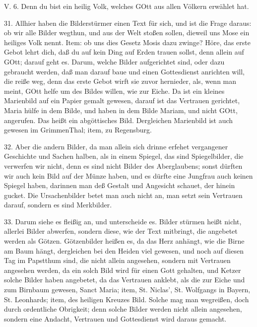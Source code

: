 \begin{schriftzitat}
V. 6. Denn du bist ein heilig Volk, welches GOtt aus allen Völkern erwählet hat.
\end{schriftzitat}

31. Allhier haben die Bilderstürmer einen Text für sich, und ist die Frage daraus: ob wir alle Bilder wegthun, und aus der Welt stoßen sollen, dieweil uns Mose ein heiliges Volk nennt. Item: ob uns dies Gesetz Mosis dazu zwinge? Höre, das erste Gebot lehrt dich, daß du auf kein Ding auf Erden trauen sollst, denn allein auf GOtt; darauf geht es. Darum, welche Bilder aufgerichtet sind, oder dazu gebraucht werden, daß man darauf baue und einen Gottesdienst anrichten will, die reiße weg, denn das erste Gebot wirft sie zuvor hernieder, als, wenn man meint, GOtt helfe um des Bildes willen, wie zur Eiche. Da ist ein kleines Marienbild auf ein Papier gemalt gewesen, darauf ist das Vertrauen gerichtet, Maria hülfe in dem Bilde, und haben in dem Bilde Mariam, und nicht GOtt, angerufen. Das heißt ein abgöttisches Bild. Dergleichen Marienbild ist auch gewesen im GrimmenThal; item, zu Regensburg.

32. Aber die andern Bilder, da man allein sich drinne erfehet vergangener Geschichte und Sachen halben, als in einem Spiegel, das sind Spiegelbilder, die verwerfen wir nicht, denn es sind nicht Bilder des Aberglaubens; sonst dürften wir auch kein Bild auf der Münze haben, und es dürfte eine Jungfrau auch keinen Spiegel haben, darinnen man deß Gestalt und Angesicht schauet, der hinein gucket. Die Ursachenbilder betet man auch nicht an, man setzt sein Vertrauen darauf, sondern es sind Merkbilder.

33. Darum siehe es fleißig an, und unterscheide es. Bilder stürmen heißt nicht, allerlei Bilder abwerfen, sondern diese, wie der Text mitbringt, die angebetet werden als Götzen. Götzenbilder heißen es, da das Herz anhängt, wie die Birne am Baum hängt, dergleichen bei den Heiden viel gewesen, und noch auf diesen Tag im Papstthum sind, die nicht allein angesehen, sondern mit Vertrauen angesehen werden, da ein solch Bild wird für einen Gott gehalten, und Ketzer solche Bilder haben angebetet, da das Vertrauen anklebt, als die zur Eiche und zum Birnbaum gewesen, Sanct Maria; item, St. Niclas’, St. Wolfgangs in Bayern, St. Leonhards; item, des heiligen Kreuzes Bild. Solche mag man wegreißen, doch durch ordentliche Obrigkeit; denn solche Bilder werden nicht allein angesehen, sondern eine Andacht, Vertrauen und Gottesdienst wird daraus gemacht.

